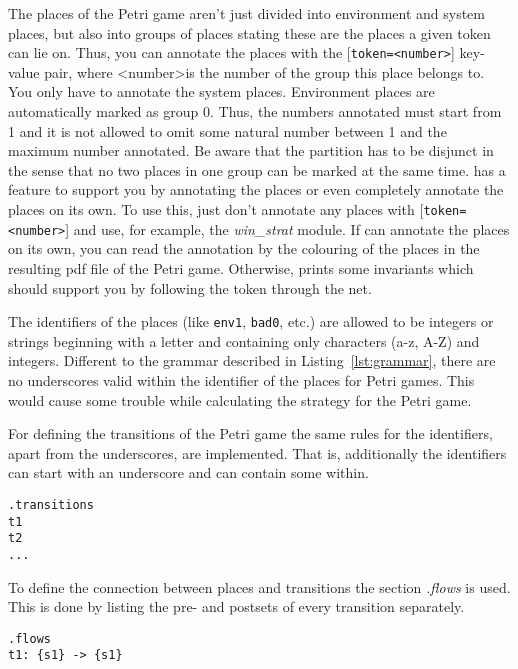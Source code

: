 The places of the Petri game aren't just divided into environment and system places, but
also into groups of places stating these are the places a given token can lie on. Thus, 
you can annotate the places with the [\texttt{token=\textless{}number\textgreater}] key-value pair, where \textless{}number\textgreater is the number of the group this place belongs to. You only have to annotate the system 
places. Environment places are automatically marked as group 0. Thus, the numbers
annotated must start from 1 and it is not allowed to omit some natural number between 1
and the maximum number annotated. Be aware that the partition has to be disjunct in the 
sense that no two places in one group can be marked at the same time. \tool{} has a feature 
to support you by annotating the places or even completely annotate the places on its own.
To use this, just don't annotate any places with [\texttt{token=\textless{}number\textgreater{}}] and use, for example, 
the \emph{win\_strat} module. If \tool{} can annotate the places on its own, you can read the
annotation by the colouring of the places in the resulting pdf file of the Petri game.
Otherwise, \tool{} prints some invariants which should support you by following the token 
through the net.

The identifiers of the places (like \texttt{env1}, \texttt{bad0}, etc.) are allowed to be integers or strings beginning with a letter and containing only characters (a-z, A-Z) and integers. Different to the grammar described in Listing~\ref{lst:grammar}, there are no underscores valid within the identifier of the places for Petri games. This would cause some trouble while calculating the strategy for the Petri game.

For defining the transitions of the Petri game the same rules for the identifiers, apart from the underscores, are implemented. That is, additionally the identifiers can start with an underscore and can contain some within.

\begin{lstlisting}[language=apt-format]
.transitions
t1
t2
...
\end{lstlisting}

To define the connection between places and transitions the section \textit{.flows} is used. This is done by listing the pre- and postsets of every transition separately.

\begin{lstlisting}[language=apt-format]
.flows
t1: {s1} -> {s1}
\end{lstlisting}

